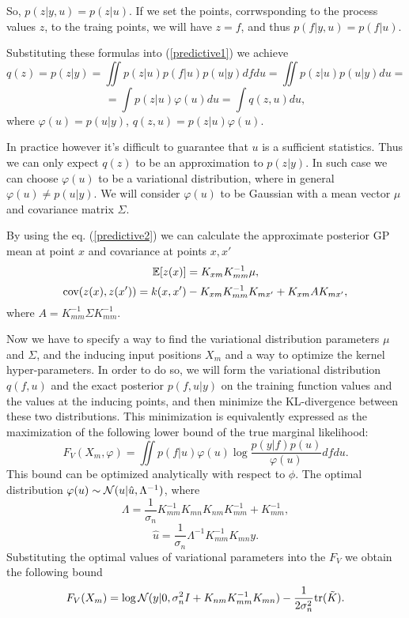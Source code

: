 \documentclass[12pt]{article}
\begin{document}
		So, $p(z|y, u) = p(z|u)$. If we set the points, corrwsponding to the process values $z$, to the traing points, we will have $z = f$, and thus $p(f|y, u) = p(f|u)$.

		Substituting these formulas into (\ref{predictive1}) we achieve
		$$q(z) = p(z|y) = \iint p(z|u) p(f|u) p(u|y)df du = \iint p(z|u) p(u|y) du = $$
		\begin{equation}
			\label{predictive2}
			= \int p(z|u)\varphi(u) du  = \int q(z, u) du, 
		\end{equation}
		where $\varphi(u) = p(u|y)$, $q(z, u) = p(z|u)\varphi(u)$.

		In practice however it's difficult to guarantee that $u$ is a sufficient statistics. Thus we can only expect $q(z)$ to be an approximation to $p(z|y)$. In such case we can choose $\varphi(u)$ to be a variational distribution, where in general $\varphi(u) \ne p(u | y)$. We will consider $\varphi(u)$ to be Gaussian with a mean vector $\mu$ and covariance matrix $\Sigma$.

		By using the eq. (\ref{predictive2}) we can calculate the approximate posterior GP mean at point $x$ and covariance at points $x, x'$
		$$\mathbb{E}[z(x)] = K_{xm} K_{mm}^{-1} \mu,$$ 
		$$\mbox{cov}(z(x), z(x')) = k(x, x') - K_{xm} K_{mm}^{-1} K_{mx'} + K_{xm} A K_{mx'},$$
		where $A = K_{mm}^{-1} \Sigma K_{mm}^{-1}$.

		Now we have to specify a way to find the variational distribution parameters $\mu$ and $\Sigma$, and the inducing input positions $X_m$ and a way to optimize the kernel hyper-parameters. 
		In order to do so, we will form the variational distribution $q(f, u)$ and the exact posterior $p(f, u|y)$ on the training function values and the values at the inducing points, and then minimize the KL-divergence between these two distributions. This minimization is equivalently expressed as the maximization of the following lower bound of the true marginal likelihood:
		$$F_V(X_m, \varphi) = \iint p(f|u) \varphi(u) \log \frac{p(y|f) p(u)}{\varphi(u)} df du.$$
		This bound can be optimized analytically with respect to $\phi$. The optimal distribution $\varphi(u) \sim \mathcal{N}(u|\hat u, \Lambda^{-1})$, where
		$$\Lambda = \frac 1 {\sigma_n} K_{mm}^{-1} K_{mn} K_{nm} K_{mm}^{-1} + K_{mm}^{-1},$$
		$$\hat u = \frac 1 {\sigma_n} \Lambda^{-1} K_{mm}^{-1} K_{mn} y.$$
		Substituting the optimal values of variational parameters into the $F_V$ we obtain the following bound
		$$F_V(X_m) = \log \mathcal{N}(y|0, \sigma_n^2 I + K_{nm} K_{mm}^{-1} K_{mn}) - \frac 1 {2\sigma_n^2} \mbox{tr}(\tilde K).$$
\end{document}
